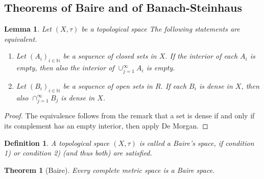 \documentclass[11pt,a4paper]{article}
\newtheorem{lem}{Lemma}[section]
\newtheorem{thm}{Theorem}[section]
\newtheorem{defn}{Definition}[section]
\theoremstyle{definition}
\begin{document}
\subsection{Theorems of Baire and of Banach-Steinhaus}
\begin{lem} Let $(X, \tau)$ be a topological space The following statements are equivalent.
\begin{enumerate}
\item Let $(A_i)_{i \in \mathbb{N}}$ be a sequence of closed sets in $X$. If the interior of each $A_i$ is empty, then also the interior of $\cup_{j=1}^\infty A_i$ is empty. 
\item Let $(B_i)_{i \in \mathbb{N}}$ be a sequence of open sets in $R$. If each $B_i$ is dense in $X$, then also $\cap_{j=1}^\infty B_j$ is dense in $X$. 
\end{enumerate}
\end{lem}
\begin{proof}
The equivalence follows from the remark that a set is dense if and only if its complement has an empty interior, then apply De Morgan. 
\end{proof}
\begin{defn} A topological space $(X, \tau)$ is called a Baire's space, if condition 1) or condition 2) (and thus both) are satisfied. 
\end{defn}
\begin{thm}[Baire] Every complete metric space is a Baire space. 
\end{thm}
\end{document}
